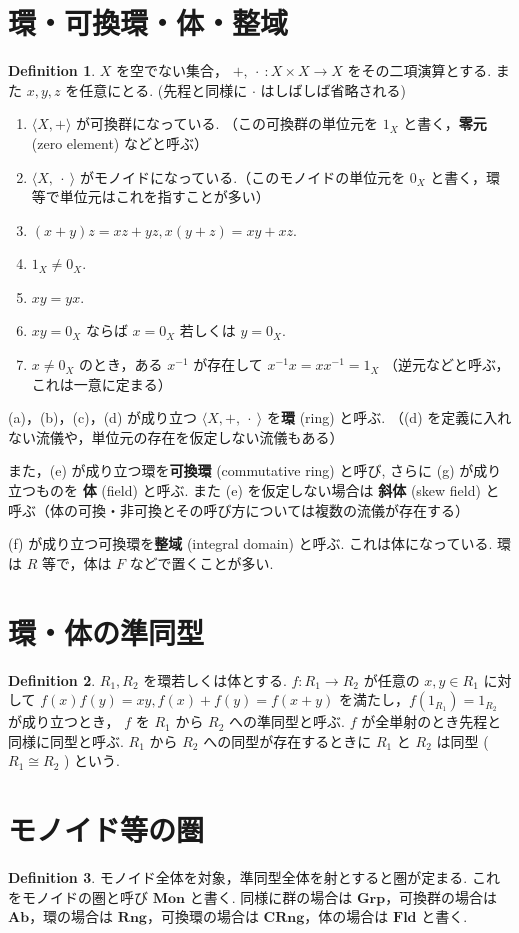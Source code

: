 \documentclass[landscape, twocolumn, column_gap=2zw, head_space=15mm, foot_space=15mm, font_size=5pt, jafontscale=0.9, line_length=40zw]{jlreq}
\theoremstyle{definition}
\newtheorem{definition}{Definition}[section]
\begin{document}
 \section{環・可換環・体・整域}
 \begin{definition}
  $X$ を空でない集合， $+,\ \cdot\ : X \times X \rightarrow X$ をその二項演算とする. また $x, y, z$ を任意にとる. (先程と同様に $\cdot$ はしばしば省略される)
  \begin{enumerate}
   \item $\langle X, +\rangle$ が可換群になっている. （この可換群の単位元を $1_X$ と書く，\textbf{零元} (zero element) などと呼ぶ）
   \item $\langle X, \ \cdot\ \rangle$ がモノイドになっている.（このモノイドの単位元を $0_X$ と書く，環等で単位元はこれを指すことが多い）
   \item $(x + y)z = xz + yz, x(y+z)=xy+xz$.
   \item $1_X \neq 0_X$.
   \item $xy = yx$.
   \item $xy=0_X$ ならば $x=0_X$ 若しくは $y=0_X$.
   \item $x \neq 0_X$ のとき，ある $x^{-1}$ が存在して $x^{-1}x = xx^{-1}=1_X$ （逆元などと呼ぶ，これは一意に定まる）
  \end{enumerate}

  (a)，(b)，(c)，(d) が成り立つ $\langle X, +, \ \cdot\ \rangle$ を\textbf{環} (ring) と呼ぶ. （(d) を定義に入れない流儀や，単位元の存在を仮定しない流儀もある）

また，(e) が成り立つ環を\textbf{可換環} (commutative ring) と呼び, さらに (g) が成り立つものを \textbf{体} (field) と呼ぶ. また (e) を仮定しない場合は \textbf{斜体} (skew field) と呼ぶ（体の可換・非可換とその呼び方については複数の流儀が存在する）

(f) が成り立つ可換環を\textbf{整域} (integral domain) と呼ぶ. これは体になっている. 環は $R$ 等で，体は $F$ などで置くことが多い.
 \end{definition}

 \section{環・体の準同型}
 \begin{definition}
  $R_1, R_2$ を環若しくは体とする. $f : R_1 \rightarrow R_2$ が任意の $x, y ∈ R_1$ に対して $f(x)f(y) = xy, f(x)+f(y)=f(x+y)$ を満たし，$f(1_{R_1}) = 1_{R_2}$ が成り立つとき， $f$ を $R_1$ から $R_2$ への準同型と呼ぶ. $f$ が全単射のとき先程と同様に同型と呼ぶ. $R_1$ から $R_2$ への同型が存在するときに $R_1$ と $R_2$ は同型 ( $R_1 \cong R_2$ ) という.
 \end{definition}

 \section{モノイド等の圏}
\begin{definition}
 モノイド全体を対象，準同型全体を射とすると圏が定まる. これをモノイドの圏と呼び $\mathbf{Mon}$ と書く. 同様に群の場合は $\mathbf{Grp}$，可換群の場合は $\mathbf{Ab}$，環の場合は $\mathbf{Rng}$，可換環の場合は $\mathbf{CRng}$，体の場合は $\mathbf{Fld}$ と書く.
\end{definition}
\end{document}
